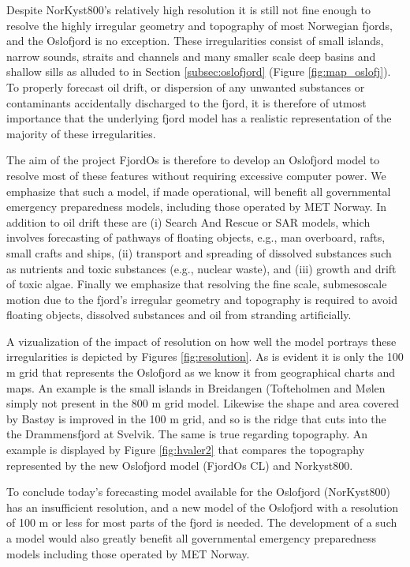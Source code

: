 Despite NorKyst800's relatively high resolution it is still not fine enough to resolve the highly irregular geometry and topography of most Norwegian fjords, and the Oslofjord is no exception. These irregularities consist of small islands, narrow sounds, straits and channels and many smaller scale deep basins and shallow sills as alluded to in Section \ref{subsec:oslofjord} (Figure \ref{fig:map_oslofj}). To properly forecast oil drift, or dispersion of any unwanted substances or contaminants accidentally discharged to the fjord, it is therefore of utmost importance that the underlying fjord model has a realistic representation of the majority of these irregularities. 

The aim of the project FjordOs is therefore to develop an Oslofjord model to resolve most of these features without requiring excessive computer power. We emphasize that such a model, if made operational, will benefit all governmental emergency preparedness models, including those operated by MET Norway. In addition to oil drift these are (i) Search And Rescue or SAR models, which involves forecasting of pathways of floating objects, e.g., man overboard, rafts, small crafts and ships, (ii) transport and spreading of dissolved substances such as nutrients and toxic substances (e.g., nuclear waste), and (iii) growth and drift of toxic algae. Finally we emphasize that resolving the fine scale, submesoscale motion due to the fjord's irregular geometry and topography is required to avoid floating objects, dissolved substances and oil from stranding artificially.  

A vizualization of the impact of resolution on how well the model portrays these irregularities is depicted by Figures \ref{fig:resolution}. As is evident it is only the 100 m grid that represents the Oslofjord as we know it from geographical charts and maps. An example is the small islands in Breidangen (Tofteholmen and M{\o}len simply not present in the 800 m grid model. Likewise the shape and area covered by Bast{\o}y is improved in the 100 m grid, and so is the ridge that cuts into the the Drammensfjord at Svelvik. The same is true regarding topography. An example is displayed by Figure \ref{fig:hvaler2} that compares the topography represented by the new Oslofjord model (FjordOs CL) and Norkyst800. 

To conclude today's forecasting model available for the Oslofjord (NorKyst800) has an insufficient resolution, and a new model of the Oslofjord with a resolution of 100 m or less for most parts of the fjord is needed. The development of a such a model would also greatly benefit all governmental emergency preparedness models including those operated by MET Norway.   


